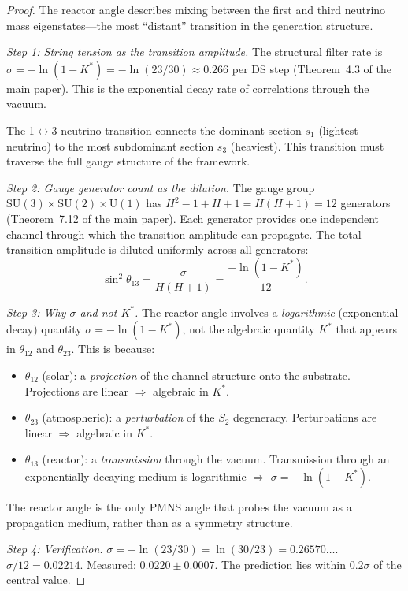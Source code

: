 \documentclass[11pt,a4paper]{article}
\theoremstyle{definition}
\theoremstyle{remark}
\newcommand{\SU}{\mathrm{SU}}
\newcommand{\U}{\mathrm{U}}
\begin{document}
\begin{proof}
The reactor angle describes mixing between the first and third neutrino mass eigenstates---the most ``distant'' transition in the generation structure.

\emph{Step 1: String tension as the transition amplitude.}
The structural filter rate is $\sigma = -\ln(1-K^*) = -\ln(23/30) \approx 0.266$ per DS step (Theorem~4.3 of the main paper). This is the exponential decay rate of correlations through the vacuum.

The 1$\leftrightarrow$3 neutrino transition connects the dominant section $s_1$ (lightest neutrino) to the most subdominant section $s_3$ (heaviest). This transition must traverse the full gauge structure of the framework.

\emph{Step 2: Gauge generator count as the dilution.}
The gauge group $\SU(3) \times \SU(2) \times \U(1)$ has $H^2-1 + H + 1 = H(H+1) = 12$ generators (Theorem~7.12 of the main paper). Each generator provides one independent channel through which the transition amplitude can propagate. The total transition amplitude is diluted uniformly across all generators:
\[
\sin^2\theta_{13} = \frac{\sigma}{H(H+1)} = \frac{-\ln(1-K^*)}{12}.
\]

\emph{Step 3: Why $\sigma$ and not $K^*$.}
The reactor angle involves a \emph{logarithmic} (exponential-decay) quantity $\sigma = -\ln(1-K^*)$, not the algebraic quantity $K^*$ that appears in $\theta_{12}$ and $\theta_{23}$. This is because:
\begin{itemize}[nosep]
\item $\theta_{12}$ (solar): a \emph{projection} of the channel structure onto the substrate. Projections are linear $\Rightarrow$ algebraic in $K^*$.
\item $\theta_{23}$ (atmospheric): a \emph{perturbation} of the $S_2$ degeneracy. Perturbations are linear $\Rightarrow$ algebraic in $K^*$.
\item $\theta_{13}$ (reactor): a \emph{transmission} through the vacuum. Transmission through an exponentially decaying medium is logarithmic $\Rightarrow$ $\sigma = -\ln(1-K^*)$.
\end{itemize}
The reactor angle is the only PMNS angle that probes the vacuum as a propagation medium, rather than as a symmetry structure.

\emph{Step 4: Verification.}
$\sigma = -\ln(23/30) = \ln(30/23) = 0.26570\ldots$. $\sigma/12 = 0.02214$. Measured: $0.0220 \pm 0.0007$. The prediction lies within $0.2\sigma$ of the central value.
\end{proof}
\end{document}
